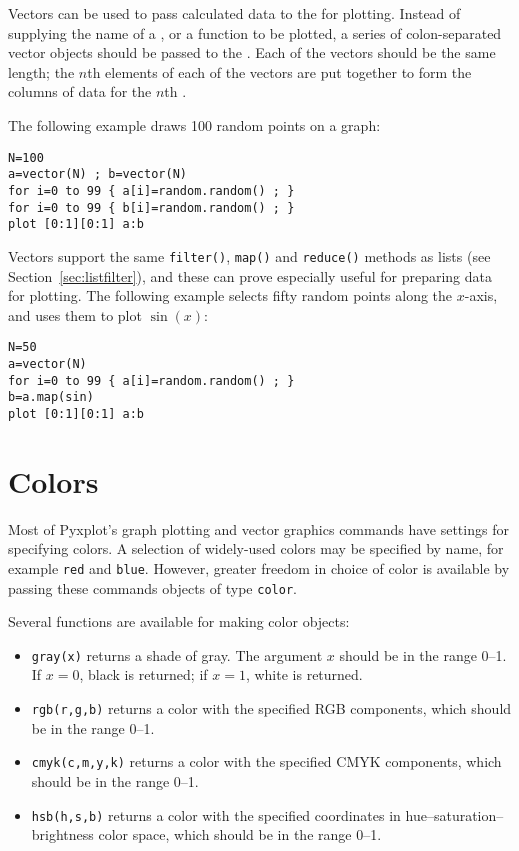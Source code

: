 Vectors can be used to pass calculated data to the  for plotting.
Instead of supplying the name of a \datafile, or a function to be plotted, a
series of colon-separated vector objects should be passed to the
. Each of the vectors should be the same length; the $n$th
elements of each of the vectors are put together to form the columns of data
for the $n$th \datapoint.

The following example draws 100 random points on a graph:

\begin{verbatim}
N=100
a=vector(N) ; b=vector(N)
for i=0 to 99 { a[i]=random.random() ; }
for i=0 to 99 { b[i]=random.random() ; }
plot [0:1][0:1] a:b
\end{verbatim}

Vectors support the same {\tt filter()}, {\tt map()} and {\tt reduce()} methods
as lists (see Section~\ref{sec:listfilter}), and these can prove especially
useful for preparing data for plotting. The following example selects fifty
random points along the $x$-axis, and uses them to plot $\sin(x)$:

\begin{verbatim}
N=50
a=vector(N)
for i=0 to 99 { a[i]=random.random() ; }
b=a.map(sin)
plot [0:1][0:1] a:b
\end{verbatim}

\section{Colors}
\label{sec:colorObjects}

Most of Pyxplot's graph plotting and vector graphics commands have settings for
specifying colors. A selection of widely-used colors may be specified by name,
for example {\tt red} and {\tt blue}. However, greater freedom in choice of
color is available by passing these commands objects of type {\tt color}.

Several functions are available for making color objects:

\begin{itemize}
\item {\tt gray(x)} returns a shade of gray. The argument $x$ should be in the range 0--1. If $x=0$, black is returned; if $x=1$, white is returned.
\item {\tt rgb(r,g,b)} returns a color with the specified RGB components, which should be in the range 0--1.
\item {\tt cmyk(c,m,y,k)} returns a color with the specified CMYK components, which should be in the range 0--1.
\item {\tt hsb(h,s,b)} returns a color with the specified coordinates in hue--saturation--brightness color space, which should be in the range 0--1.
\end{itemize}

